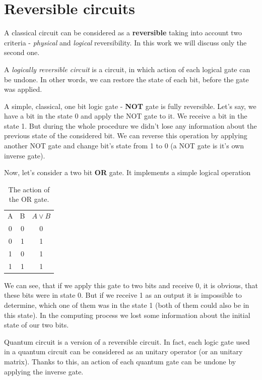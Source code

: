 \section{Reversible circuits}

A classical circuit can be considered as a \textbf{reversible} taking into account two criteria - \textit{physical} and \textit{logical} reversibility. In this work we will discuss only the second one.

A \textit{logically reversible circuit} is a circuit, in which action of each logical gate can be undone. In other words, we can restore the state of each bit, before the gate was applied.

A simple, classical, one bit logic gate - \textbf{NOT} gate is fully reversible. Let's say, we have a bit in the state 0 and apply the NOT gate to it. We receive a bit in the state 1. But during the whole procedure we didn't lose any information about the previous state of the considered bit. We can reverse this operation by applying another NOT gate and change bit's state from 1 to 0 (a NOT gate is it's own inverse gate).

Now, let's consider a two bit \textbf{OR} gate. It implements a simple logical operation

\begin{table}[ht]
    \centering
    \begin{tabular}{c|c|c}
         A & B & $A \vee B$ \\
         0 & 0 & 0 \\
         0 & 1 & 1 \\
         1 & 0 & 1 \\
         1 & 1 & 1
    \end{tabular}
    \caption{The action of the OR gate.}
    \label{tab:or_gate_action}
\end{table}

We can see, that if we apply this gate to two bits and receive 0, it is obvious, that these bits were in state 0. But if we receive 1 as an output it is impossible to determine, which one of them was in the state 1 (both of them could also be in this state). In the computing process we lost some information about the initial state of our two bits.

Quantum circuit is a version of a reversible circuit. In fact, each logic gate used in a quantum circuit can be considered as an unitary operator (or an unitary matrix). Thanks to this, an action of each quantum gate can be undone by applying the inverse gate.

